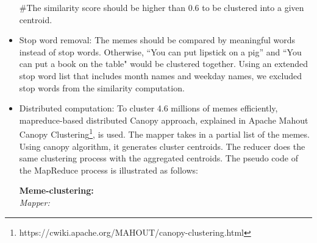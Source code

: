 \documentclass{sig-alternate}
\begin{document}
\begin{itemize}
#The similarity score should be higher than 0.6 to be clustered into a given centroid.
 
 \item Stop word removal: The memes should be compared by meaningful words instead of stop words. Otherwise, ``You can put lipstick on a pig'' and ``You can put a book on the table" would be clustered together. Using an extended stop word list that includes month names and weekday names, we excluded stop words from the similarity computation. 
 \item Distributed computation: To cluster 4.6 millions of memes efficiently, mapreduce-based distributed Canopy approach, explained in Apache Mahout Canopy Clustering\footnote{https://cwiki.apache.org/MAHOUT/canopy-clustering.html}, is used. The mapper takes in a partial list of the memes. Using canopy algorithm, it generates cluster centroids. The reducer does the same clustering process with the aggregated centroids. The pseudo code of the MapReduce process is illustrated as follows:
 

\begin{centering}
\begin{tabbing}
\textbf{Meme-clustering:}\\
\emph{Mapper:}\\


\end{tabbing}
\end{centering}
\end{itemize}
\end{document}
